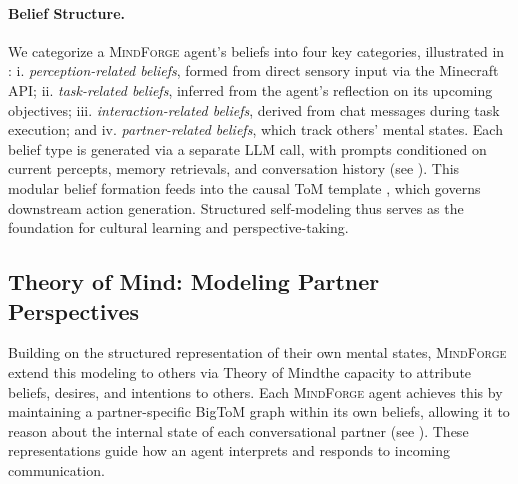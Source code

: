 \documentclass{article}
\newcommand{\collabvoyager}[0]{\mbox{\textsc{MindForge}}\xspace}
\begin{document}
\paragraph{Belief Structure.} We categorize a \collabvoyager agent's beliefs into four key categories, illustrated in : i. \textit{perception-related beliefs}, formed from direct sensory input via the Minecraft API; ii. \textit{task-related beliefs}, inferred from the agent's reflection on its upcoming objectives; iii. \textit{interaction-related beliefs}, derived from chat messages during task execution; and iv. \textit{partner-related beliefs}, which track others' mental states. Each belief type is generated via a separate LLM call, with prompts conditioned on current percepts, memory retrievals, and conversation history (see ). This modular belief formation feeds into the causal ToM template , which governs downstream action generation. Structured self-modeling thus serves as the foundation for cultural learning and perspective-taking. 


\subsection{Theory of Mind: Modeling Partner Perspectives}\label{ssec:soc-aware-persp}

Building on the structured representation of their own mental states, \collabvoyager extend this modeling to others via Theory of Mind\textemdash the capacity to attribute beliefs, desires, and intentions to others. 
Each \collabvoyager agent achieves this by maintaining a partner-specific BigToM graph within its own beliefs, allowing it to reason about the internal state of each conversational partner (see ). These representations guide how an agent interprets and responds to incoming communication. 
\end{document}
